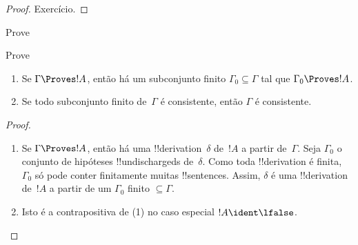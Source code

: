 \documentclass[../../../include/open-logic-section]{subfiles}
\begin{document}
\begin{proof}
Exercício.
\end{proof}

\begin{prob}
Prove 
\end{prob}
\tagendprob

\begin{prob}
Prove 
\end{prob}
\tagendprob

\begin{prop}[Compacidade]
  \begin{enumerate}
  \item Se $\Gamma \Proves !A$, então há um subconjunto finito $\Gamma_0
    \subseteq \Gamma$ tal que $\Gamma_0 \Proves !A$.
  \item Se todo subconjunto finito de~$\Gamma$ é
    consistente, então $\Gamma$ é consistente.
  \end{enumerate}
\end{prop}

\begin{proof}
  \begin{enumerate}
    \item Se $\Gamma \Proves !A$, então há uma
      !!{derivation}~$\delta$ de~$!A$ a partir de~$\Gamma$. Seja $\Gamma_0$
      o conjunto de hipóteses !!{undischarged}s de~$\delta$.  Como
      toda !!{derivation} é finita, $\Gamma_0$ só pode conter
      finitamente muitas !!{sentence}s.  Assim, $\delta$ é uma !!{derivation}
      de~$!A$ a partir de um $\Gamma_0$ finito $\subseteq \Gamma$.
    \item Isto é a contrapositiva de (1) no caso especial $!A
      \ident \lfalse$.
  \end{enumerate}
\end{proof}
\end{document}

